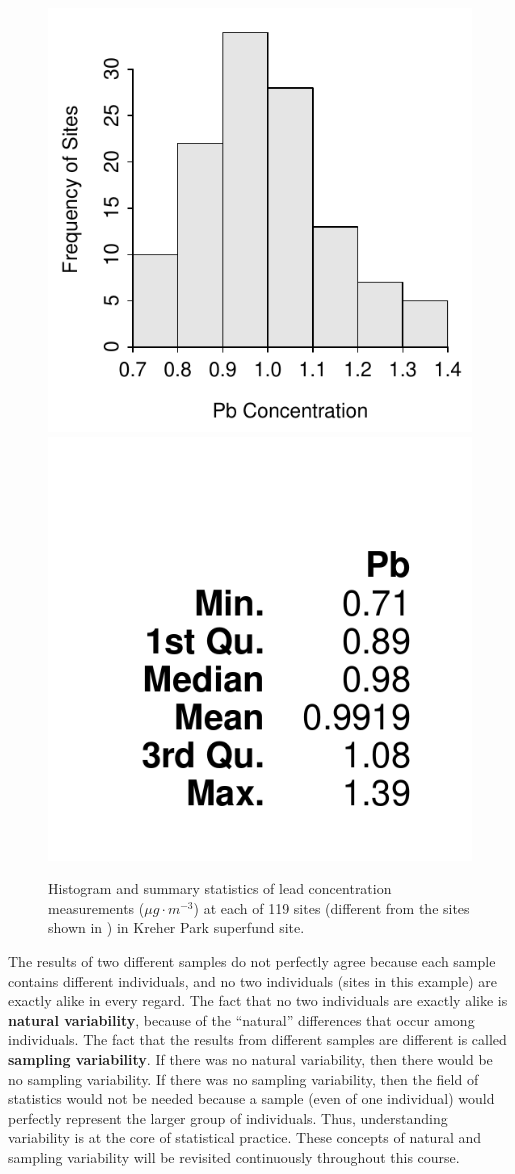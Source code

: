 \documentclass[10pt,openany]{book}\usepackage[]{graphicx}\usepackage[]{color}
\newenvironment{knitrout}{}{} %
\begin{document}
\begin{knitrout}
\color{fgcolor}\begin{figure}[hbtp]

{\centering \includegraphics[width=.4\linewidth]{Figs/KreherParkPbhist1-1} 
\includegraphics[width=.4\linewidth]{Figs/KreherParkPbhist1-2} 

}

\caption[Kreher Park 1]{Histogram and summary statistics of lead concentration measurements ($\mu g \cdot m^{-3}$) at each of 119 sites (different from the sites shown in ) in Kreher Park superfund site.}\label{fig:KreherParkPbhist1}
\end{figure}


\end{knitrout}

The results of two different samples do not perfectly agree because each sample contains different individuals, and no two individuals (sites in this example) are exactly alike in every regard.  The fact that no two individuals are exactly alike is \textbf{natural variability}, because of the ``natural'' differences that occur among individuals.  The fact that the results from different samples are different is called \textbf{sampling variability}.  If there was no natural variability, then there would be no sampling variability.  If there was no sampling variability, then the field of statistics would not be needed because a sample (even of one individual) would perfectly represent the larger group of individuals.  Thus, understanding variability is at the core of statistical practice.  These concepts of natural and sampling variability will be revisited continuously throughout this course.
\end{document}
